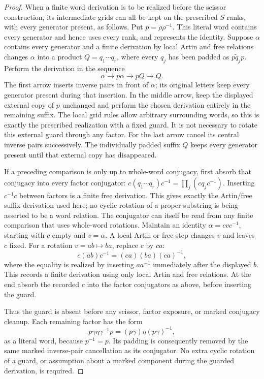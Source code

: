 \documentclass[11pt,a4paper]{article}
\theoremstyle{remark}
\begin{document}
\begin{proof}
When a finite word derivation is to be realized before the scissor
construction, its intermediate grids can all be kept on the prescribed
$S$ ranks, with every generator present, as follows.  Put
$p=\rho\rho^{-1}$.  This literal word contains every generator and
hence uses every rank, and represents the identity.  Suppose $\alpha$
contains every generator and a finite derivation by local Artin and free
relations changes $\alpha$ into a product
$Q=q_1\cdots q_r$, where every $q_j$ has been padded as
$p\widetilde q_jp$.  Perform the derivation in the sequence
\[
 \alpha\longrightarrow p\alpha
 \longrightarrow pQ\longrightarrow Q.
\]
The first arrow inserts inverse pairs in front of $\alpha$; its
original letters keep every generator present during that insertion.  In
the middle arrow, keep the displayed external copy of $p$ unchanged
and perform the chosen derivation entirely in the remaining suffix.
The local grid rules allow arbitrary surrounding words, so this is
exactly the prescribed realization with a fixed guard.  It is not
necessary to rotate this external guard through any factor.  For the
last arrow cancel its central inverse pairs successively.  The
individually padded suffix $Q$ keeps every generator present until that
external copy has disappeared.

If a preceding comparison is only up to whole-word conjugacy, first
absorb that conjugacy into every factor conjugator:
$c(q_1\cdots q_r)c^{-1}=\prod_j(cq_jc^{-1})$.
Inserting $c^{-1}c$ between factors is a finite free derivation.
This gives exactly the Artin/free suffix derivation used here; no
cyclic rotation of a proper substring is being asserted to be a
word relation.
The conjugator can itself be read from any finite comparison that
uses whole-word rotations.  Maintain an identity
$\alpha=cvc^{-1}$, starting with $c$ empty and $v=\alpha$.
A local Artin or free step changes $v$ and leaves $c$ fixed.
For a rotation $v=ab\mapsto ba$, replace $c$ by $ca$:
\[
 c(ab)c^{-1}=(ca)(ba)(ca)^{-1},
\]
where the equality is realized by inserting $aa^{-1}$ immediately
after the displayed $b$.  This records a finite derivation using
only local Artin and free relations.  At the end absorb the recorded
$c$ into the factor conjugators as above, before inserting the guard.

Thus the guard is absent before any scissor, factor exposure, or marked
conjugacy cleanup.  Each remaining factor has the form
\[
 p\gamma\eta\gamma^{-1}p
   =(p\gamma)\eta(p\gamma)^{-1},
\]
as a literal word, because $p^{-1}=p$.  Its padding is consequently
removed by the same marked inverse-pair cancellation as its
conjugator.  No extra cyclic rotation of a guard, or assumption about
a marked component during the guarded derivation, is required.

\end{proof}
\end{document}
